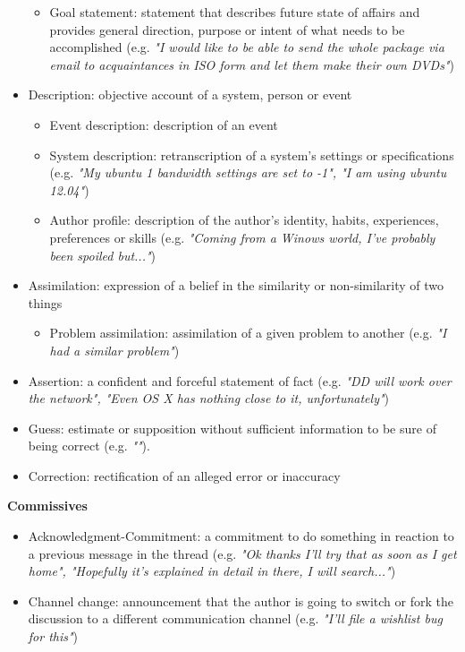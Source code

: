 \documentclass[11pt]{article}
\begin{document}
\begin{itemize}
\begin{itemize}
			\item Goal statement: statement that describes future state of affairs and provides general direction, purpose or intent of what needs to be accomplished (e.g. \textit{"I would like to be able to send the whole package via email to acquaintances in ISO form and let them make their own DVDs"})
		\end{itemize}
	\item Description: objective account of a system, person or event
		\begin{itemize}
			\item Event description: description of an event
			\item System description: retranscription of a system's settings or specifications (e.g. \textit{"My ubuntu 1 bandwidth settings are set to -1", "I am using ubuntu 12.04"})
			\item Author profile: description of the author's identity, habits, experiences, preferences or skills (e.g. \textit{"Coming from a Winows world, I've probably been spoiled but..."})
		\end{itemize}
	\item Assimilation: expression of a belief in the similarity or non-similarity of two things
		\begin{itemize}
			\item Problem assimilation: assimilation of a given problem to another (e.g. \textit{"I had a similar problem"})
		\end{itemize}
	\item Assertion: a confident and forceful statement of fact (e.g. \textit{"DD will work over the network", "Even OS X has nothing close to it, unfortunately"})
	\item Guess: estimate or supposition without sufficient information to be sure of being correct (e.g. \textit{""}).
	\item Correction: rectification of an alleged error or inaccuracy
\end{itemize}

\textbf{Commissives}

\begin{itemize}
	\item Acknowledgment-Commitment: a commitment to do something in reaction to a previous message in the thread (e.g. \textit{"Ok thanks I'll try that as soon as I get home", "Hopefully it's explained in detail in there, I will search..."})
	\item Channel change: announcement that the author is going to switch or fork the discussion to a different communication channel (e.g. \textit{"I'll file a wishlist bug for this"})
\end{itemize}
\end{document}
